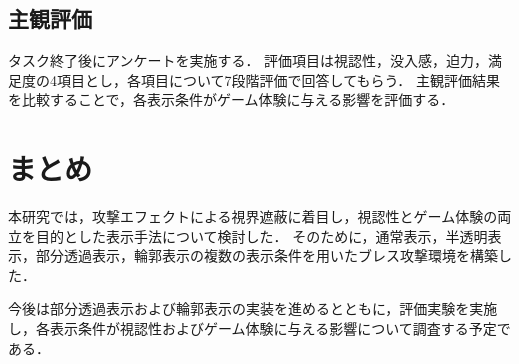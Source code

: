\documentclass[uplatex,9pt]{jsarticle}
\begin{document}
\subsection{主観評価}

タスク終了後にアンケートを実施する．
評価項目は視認性，没入感，迫力，満足度の4項目とし，各項目について7段階評価で回答してもらう．
主観評価結果を比較することで，各表示条件がゲーム体験に与える影響を評価する．

\section{まとめ}

本研究では，攻撃エフェクトによる視界遮蔽に着目し，視認性とゲーム体験の両立を目的とした表示手法について検討した．
そのために，通常表示，半透明表示，部分透過表示，輪郭表示の複数の表示条件を用いたブレス攻撃環境を構築した．

今後は部分透過表示および輪郭表示の実装を進めるとともに，評価実験を実施し，各表示条件が視認性およびゲーム体験に与える影響について調査する予定である．



\end{document}
